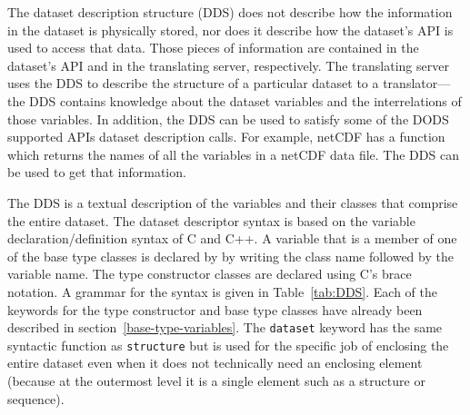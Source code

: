 The dataset description structure (DDS) does not describe how the
information in the dataset is physically stored, nor does it describe
how the dataset's API is used to access that data. Those pieces of
information are contained in the dataset's API and in the translating
server, respectively.  The translating server uses the DDS to describe
the structure of a particular dataset to a translator---the DDS
contains knowledge about the dataset variables and the interrelations
of those variables.  In addition, the DDS can be used to satisfy some
of the DODS supported APIs dataset description calls. For example,
netCDF has a function which returns the names of all the variables in
a netCDF data file. The DDS can be used to get that information.

The DDS is a textual description of the variables and their classes
that comprise the entire dataset. The dataset descriptor syntax is
based on the variable declaration/definition syntax of C and C++. A
variable that is a member of one of the base type classes is declared
by by writing the class name followed by the variable name. The type
constructor classes are declared using C's brace notation. A grammar
for the syntax is given in Table~\ref{tab:DDS}. Each of the keywords
for the type constructor and base type classes have already been
described in section~\ref{base-type-variables}. The {\tt dataset}
keyword has the same syntactic function as {\tt structure} but is used
for the specific job of enclosing the entire dataset even when it
does not technically need an enclosing element (because at the
outermost level it is a single element such as a structure or
sequence).

